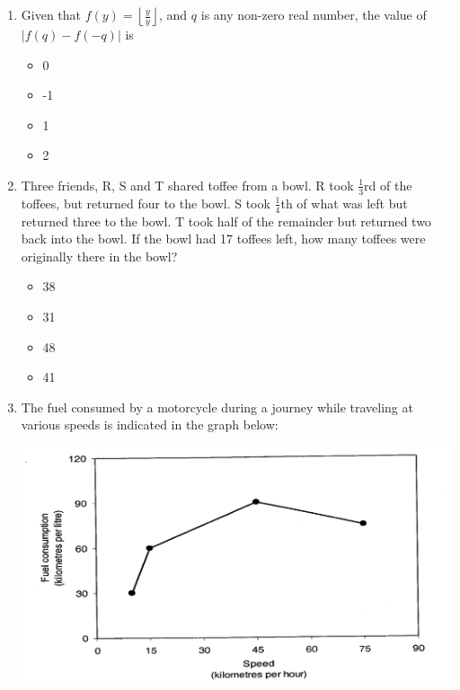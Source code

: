 \documentclass[journal,12pt,onecolumn]{IEEEtran}
\theoremstyle{remark}
\begin{document}
\begin{enumerate}
 

\item    \hspace{0.5cm} Given that $f(y) = \left\lfloor \frac{y}{y} \right\rfloor$, and $q$ is any non-zero real number, the value of $|f(q) - f(-q)|$ is  \hfill{}

\begin{multicols}{2}
\begin{itemize}[label=(A)]
    \item 0
    \item -1
    \item 1
    \item 2
\end{itemize}
\end{multicols}

 

\item    \hspace{0.5cm} Three friends, R, S and T shared toffee from a bowl. R took $\frac{1}{3}$rd of the toffees, but returned four to the bowl. S took $\frac{1}{4}$th of what was left but returned three to the bowl. T took half of the remainder but returned two back into the bowl. If the bowl had 17 toffees left, how many toffees were originally there in the bowl?  \hfill{}

\begin{multicols}{2}
\begin{itemize}[label=(A)]
    \item 38
    \item 31
    \item 48
    \item 41
\end{itemize}
\end{multicols}

 

\item    \hspace{0.5cm} The fuel consumed by a motorcycle during a journey while traveling at various speeds is indicated in the graph below:  \hfill{}

 

\begin{center}
\includegraphics[width=\textwidth]{figs/image21.png}


\end{center}
\end{enumerate}
\end{document}
